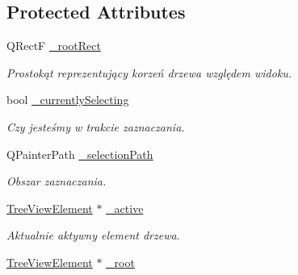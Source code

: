 \subsection*{Protected Attributes}
\begin{DoxyCompactItemize}
\item 
\hypertarget{class_tree_view_ace7726831becfd3f749d1c358b916f54}{
QRectF \hyperlink{class_tree_view_ace7726831becfd3f749d1c358b916f54}{\_\-rootRect}}
\label{class_tree_view_ace7726831becfd3f749d1c358b916f54}

\begin{DoxyCompactList}\small\item\em Prostokąt reprezentujący korzeń drzewa względem widoku. \item\end{DoxyCompactList}\item 
\hypertarget{class_tree_view_aa613d0e84d8f5a0916ad3266d9d84efc}{
bool \hyperlink{class_tree_view_aa613d0e84d8f5a0916ad3266d9d84efc}{\_\-currentlySelecting}}
\label{class_tree_view_aa613d0e84d8f5a0916ad3266d9d84efc}

\begin{DoxyCompactList}\small\item\em Czy jesteśmy w trakcie zaznaczania. \item\end{DoxyCompactList}\item 
\hypertarget{class_tree_view_a7afa3e1d36e0963f1927edbbef92606f}{
QPainterPath \hyperlink{class_tree_view_a7afa3e1d36e0963f1927edbbef92606f}{\_\-selectionPath}}
\label{class_tree_view_a7afa3e1d36e0963f1927edbbef92606f}

\begin{DoxyCompactList}\small\item\em Obszar zaznaczania. \item\end{DoxyCompactList}\item 
\hypertarget{class_tree_view_ab5a702f71ba817304249b4742b5da11d}{
\hyperlink{class_tree_view_element}{TreeViewElement} $\ast$ \hyperlink{class_tree_view_ab5a702f71ba817304249b4742b5da11d}{\_\-active}}
\label{class_tree_view_ab5a702f71ba817304249b4742b5da11d}

\begin{DoxyCompactList}\small\item\em Aktualnie aktywny element drzewa. \item\end{DoxyCompactList}\item 
\hypertarget{class_tree_view_a118be06d27a25a62da884c503b960168}{
\hyperlink{class_tree_view_element}{TreeViewElement} $\ast$ \hyperlink{class_tree_view_a118be06d27a25a62da884c503b960168}{\_\-root}}
\label{class_tree_view_a118be06d27a25a62da884c503b960168}


\end{DoxyCompactItemize}
